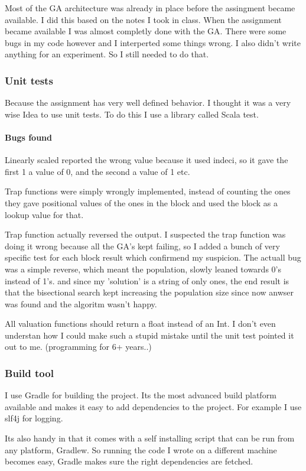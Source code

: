 \documentclass{article}
\begin{document}
Most of the GA architecture was already in place before the assingment became
available. I did this based on the notes I took in class. When the assignment
became available I was almost completly done with the GA. There were some bugs
in my code however and I interperted some things wrong. I also didn't write
anything for an experiment. So I still needed to do that.

\subsubsection{Unit tests}
Because the assignment has very well defined behavior. I thought it was
a very wise Idea to use unit tests. To do this I use a library called
Scala test.

\paragraph{Bugs found}
Linearly scaled reported the wrong value because it used indeci, so it
gave the first 1 a value of 0, and the second a value of 1 etc.

Trap functions were simply wrongly implemented, instead of counting the
ones they gave positional values of the ones in the block and used the
block as a lookup value for that.

Trap function actually reversed the output. I suspected the trap function
was doing it wrong because all the GA's kept failing, so I added a bunch
of very specific test for each block result which confirmend my suspicion.
The actuall bug was a simple reverse, which meant  the population, slowly
leaned towards 0's instead of 1's. and since my 'solution' is a string
of only ones, the end result is that the bisectional search kept increasing
the population size since now anwser was found and the algoritm wasn't happy.

All valuation functions should return a float instead of an Int.
I don't even understan how I could make such a stupid mistake until the
unit test pointed it out to me. (programming for 6+ years..)

\subsubsection{Build tool}
I use Gradle for building the project. Its the most advanced build platform
available and makes it easy to add dependencies to the project.
For example I use slf4j for logging.

Its also handy in that it comes with a self installing script that can be run
from any platform, Gradlew. So running the code I wrote on a different machine
becomes easy, Gradle makes sure the right dependencies are fetched.
\end{document}

